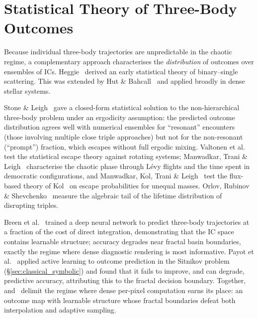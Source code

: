 \documentclass[11pt,a4paper]{article}
\begin{document}
\section{Statistical Theory of Three-Body Outcomes}

Because individual three-body trajectories are unpredictable in the chaotic regime, a
complementary approach characterises the \emph{distribution} of outcomes over ensembles of ICs.
Heggie~\cite{heggie1975} derived an early statistical theory of binary--single scattering.  This
was extended by Hut \& Bahcall~\cite{hutbahcall1983} and applied broadly in dense stellar systems.

Stone \& Leigh~\cite{stone2019} gave a closed-form statistical solution to the non-hierarchical
three-body problem under an ergodicity assumption: the predicted outcome distribution agrees well
with numerical ensembles for ``resonant'' encounters (those involving multiple close triple
approaches) but not for the non-resonant (``prompt'') fraction, which escapes without full ergodic
mixing.  Valtonen et al.~\cite{valtonen2005} test the statistical escape theory against rotating
systems; Manwadkar, Trani \& Leigh~\cite{manwadkar2020} characterise the chaotic phase through
L\'{e}vy flights and the time spent in democratic configurations, and Manwadkar, Kol, Trani \&
Leigh~\cite{manwadkar2021} test the flux-based theory of Kol~\cite{kol2021} on escape
probabilities for unequal masses.  Orlov, Rubinov \& Shevchenko~\cite{orlov2010} measure the
algebraic tail of the lifetime distribution of disrupting triples.

Breen et al.~\cite{breen2020} trained a deep neural network to predict three-body trajectories at
a fraction of the cost of direct integration, demonstrating that the IC space contains learnable
structure; accuracy degrades near fractal basin boundaries, exactly the regime where dense
diagnostic rendering is most informative.  Payot et al.~\cite{payot2023} applied active learning
to outcome prediction in the Sitnikov problem (\S\ref{sec:classical_symbolic}) and found that it
fails to improve, and can degrade, predictive accuracy, attributing this to the fractal decision
boundary.  Together,~\cite{breen2020} and~\cite{payot2023} delimit the regime where dense
per-pixel computation earns its place: an outcome map with learnable structure whose fractal
boundaries defeat both interpolation and adaptive sampling.
\end{document}
